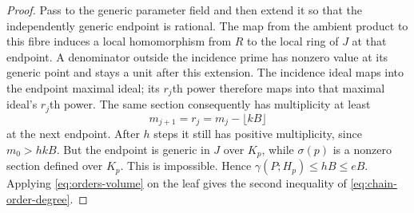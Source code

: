 \begin{proof}
Pass to the generic parameter field and then extend it so that the
independently generic endpoint is rational. The map from the ambient
product to this fibre induces a local homomorphism from $R$ to the local
ring of $J$ at that endpoint. A denominator outside the incidence prime
has nonzero value at its generic point and stays a unit after this
extension. The incidence ideal maps into the endpoint maximal ideal;
its $r_j$th power therefore maps into that maximal ideal's $r_j$th power.
The same section consequently has multiplicity at least
\[
 m_{j+1}=r_j=m_j-\lfloor kB\rfloor
\]
at the next endpoint.  After $h$ steps it still has positive
multiplicity, since $m_0>hkB$.  But the endpoint is generic in $J$ over
$K_p$, while $\sigma(p)$ is a nonzero section defined over $K_p$.
This is impossible.  Hence $\gamma(P;H_p)\le hB\le eB$.
Applying \eqref{eq:orders-volume} on the leaf gives the second inequality
of \eqref{eq:chain-order-degree}.
\end{proof}


